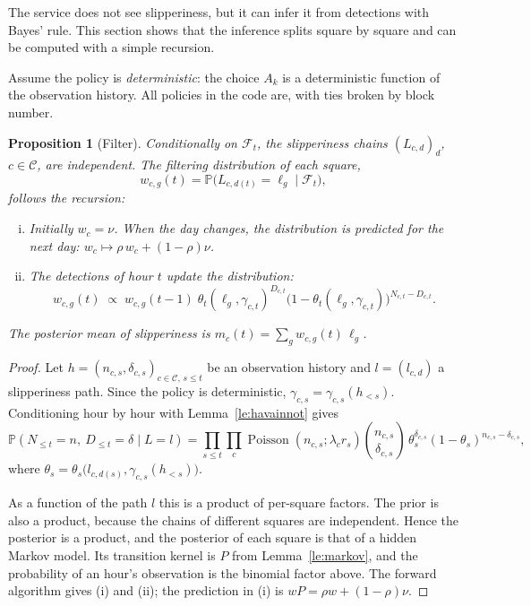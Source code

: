 \documentclass[11pt,a4paper]{article}
\theoremstyle{plain}
\newtheorem{propositio}{Proposition}
\theoremstyle{definition}
\theoremstyle{remark}
\renewcommand{\P}{\mathbb{P}}
\newcommand{\cC}{\mathcal{C}}
\newcommand{\cF}{\mathcal{F}}
\newcommand{\1}{\mathbf{1}}
\newcommand{\Poi}{\operatorname{Poisson}}
\begin{document}
The service does not see slipperiness, but it can infer it from detections with
Bayes' rule. This section shows that the inference splits square by square and
can be computed with a simple recursion.

Assume the policy is \emph{deterministic}: the choice $A_k$ is a deterministic
function of the observation history. All policies in the code are, with ties
broken by block number.

\begin{propositio}[Filter]\label{pr:suodin}
Conditionally on $\cF_t$, the slipperiness chains $(L_{c,d})_d$, $c \in \cC$, are
independent. The filtering distribution of each square,
\[
  w_{c,g}(t) = \P\bigl(L_{c,d(t)} = \ell_g \mid \cF_t\bigr),
\]
follows the recursion:
\begin{enumerate}[(i)]
  \item Initially $w_c = \nu$. When the day changes, the distribution is
  predicted for the next day: $w_c \mapsto \rho\, w_c + (1 - \rho)\nu$.
  \item The detections of hour $t$ update the distribution:
  \[
    w_{c,g}(t) \;\propto\; w_{c,g}(t-1)\; \theta_t(\ell_g, \gamma_{c,t})^{D_{c,t}}
    \bigl(1 - \theta_t(\ell_g, \gamma_{c,t})\bigr)^{N_{c,t} - D_{c,t}}.
  \]
\end{enumerate}
The posterior mean of slipperiness is $m_c(t) = \sum_g w_{c,g}(t)\, \ell_g$.
\end{propositio}

\begin{proof}
Let $h = (n_{c,s}, \delta_{c,s})_{c \in \cC,\, s \le t}$ be an observation
history and $l = (l_{c,d})$ a slipperiness path. Since the policy is
deterministic, $\gamma_{c,s} = \gamma_{c,s}(h_{<s})$. Conditioning hour by hour
with Lemma~\ref{le:havainnot} gives
\[
  \P(N_{\le t} = n,\ D_{\le t} = \delta \mid L = l)
  = \prod_{s \le t} \prod_{c} \Poi(n_{c,s}; \lambda_c r_s)
    \binom{n_{c,s}}{\delta_{c,s}}\, \theta_s^{\delta_{c,s}} (1 - \theta_s)^{n_{c,s} - \delta_{c,s}},
\]
where $\theta_s = \theta_s\bigl(l_{c,d(s)}, \gamma_{c,s}(h_{<s})\bigr)$.

As a function of the path $l$ this is a product of per-square factors. The prior
is also a product, because the chains of different squares are independent.
Hence the posterior is a product, and the posterior of each square is that of a
hidden Markov model. Its transition kernel is $P$ from Lemma~\ref{le:markov}, and
the probability of an hour's observation is the binomial factor above. The
forward algorithm gives (i) and (ii); the prediction in (i) is
$wP = \rho w + (1 - \rho)\nu$.
\end{proof}
\end{document}
